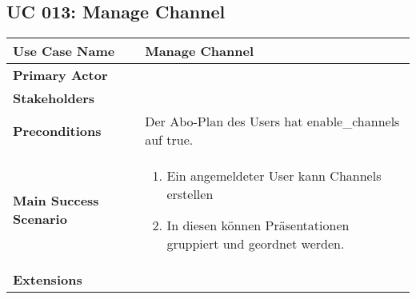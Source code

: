 \subsection{UC 013: Manage Channel}
\label{uc:013-manage-channel}

\begin{tabular}{|l|p{}|}
\hline
\textbf{Use Case Name} 	&	Manage Channel	\\ \hline
\textbf{Primary Actor} 	&		\\ \hline
\textbf{Stakeholders}	&		\\ \hline
\textbf{Preconditions}	&	Der Abo-Plan des Users hat enable_channels auf true.	\\ \hline
\textbf{Main Success Scenario}	&
\begin{enumerate}
	\item Ein angemeldeter User kann Channels erstellen
	\item In diesen können Präsentationen gruppiert und geordnet werden.
\end{enumerate}
\\ \hline
\textbf{Extensions}	& 	\\ \hline
\end{tabular}